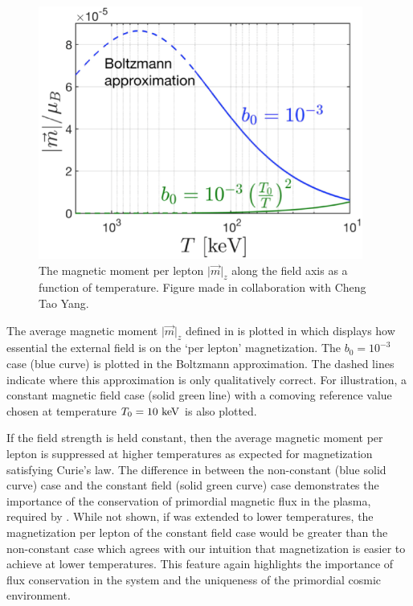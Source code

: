 \begin{figure}[ht]
 \centering
 \includegraphics[clip, trim=0.0cm 0.0cm 0.0cm 0.0cm,width=0.95\textwidth]{plots/chap04cosmo/thesis_perlepton.png}
 \caption{The magnetic moment per lepton $\vert\vec{m}\vert_{z}$ along the field axis as a function of temperature. Figure made in collaboration with Cheng Tao Yang.}
 \label{fig:momentperlepton}
\end{figure}

The average magnetic moment $\vert\vec{m}\vert_{z}$ defined in  is plotted in  which displays how essential the external field is on the `per lepton' magnetization. The $b_{0}=10^{-3}$ case (blue curve) is plotted in the Boltzmann approximation. The dashed lines indicate where this approximation is only qualitatively correct. For illustration, a constant magnetic field case (solid green line) with a comoving reference value chosen at temperature $T_{0}=10\text{ keV}$ is also plotted.

If the field strength is held constant, then the average magnetic moment per lepton is suppressed at higher temperatures as expected for magnetization satisfying Curie's law. The difference in  between the non-constant (blue solid curve) case and the constant field (solid green curve) case demonstrates the importance of the conservation of primordial magnetic flux in the plasma, required by . While not shown, if  was extended to lower temperatures, the magnetization per lepton of the constant field case would be greater than the non-constant case which agrees with our intuition that magnetization is easier to achieve at lower temperatures. This feature again highlights the importance of flux conservation in the system and the uniqueness of the primordial cosmic environment.

